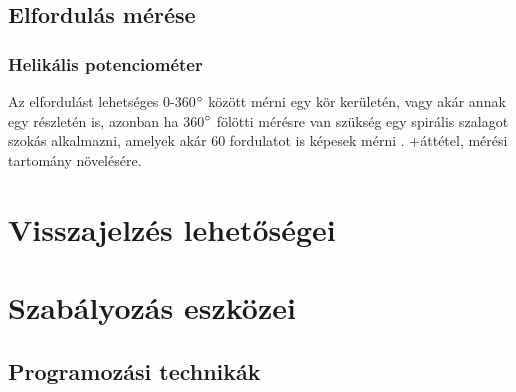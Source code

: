\subsection{Elfordulás mérése}

\subsubsection{Helikális potenciométer}

Az elfordulást lehetséges 0-360$\degree$ között mérni egy kör kerületén, vagy akár annak egy részletén is, azonban ha 360$\degree$ fölötti mérésre van szükség egy spirális szalagot szokás alkalmazni, amelyek akár 60 fordulatot is képesek mérni \cite{Morris2016b}. +áttétel, mérési tartomány növelésére.

\section{Visszajelzés lehetőségei}



\section{Szabályozás eszközei}

\subsection{Programozási technikák}
